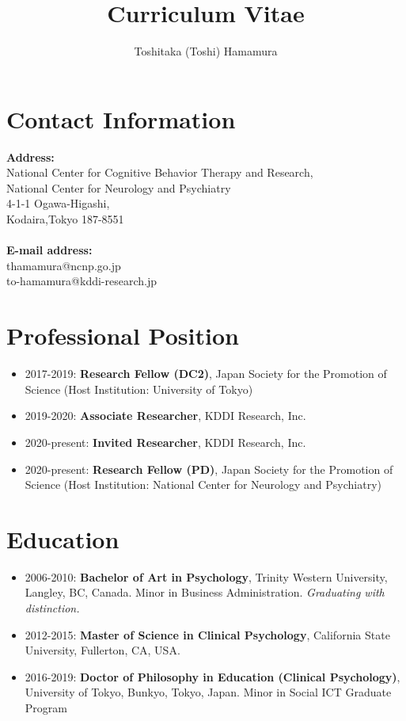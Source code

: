 \documentclass{article}
\begin{document}
\title{Curriculum Vitae}
\author{Toshitaka (Toshi) Hamamura}
\maketitle

\section{Contact Information}
\textbf{Address:}\\ 
National Center for Cognitive Behavior Therapy and Research,\\
National Center for Neurology and Psychiatry\\
4-1-1 Ogawa-Higashi,\\
Kodaira,Tokyo 187-8551\\
\\
\textbf{E-mail address:}\\	
thamamura@ncnp.go.jp\\
to-hamamura@kddi-research.jp\\

\section{Professional Position}
\begin{itemize}
	\item 2017-2019: \textbf{Research Fellow (DC2)}, Japan Society for the Promotion of Science (Host Institution: University of Tokyo)
	\item 2019-2020: \textbf{Associate Researcher}, KDDI Research, Inc.
	\item 2020-present: \textbf{Invited Researcher}, KDDI Research, Inc.
	\item 2020-present: \textbf{Research Fellow (PD)}, Japan Society for the Promotion of Science (Host Institution: National Center for Neurology and Psychiatry)
\end{itemize}

\section{Education}
\begin{itemize}
	\item 2006-2010: \textbf{Bachelor of Art in Psychology}, Trinity Western University, Langley, BC, Canada. Minor in Business Administration. \textit{Graduating with distinction.}
	\item 2012-2015: \textbf{Master of Science in Clinical Psychology}, California State University, Fullerton, CA, USA. 
	\item 2016-2019: \textbf{Doctor of Philosophy in Education (Clinical Psychology)}, University of Tokyo, Bunkyo, Tokyo, Japan. Minor in Social ICT Graduate Program
\end{itemize}
\end{document}
